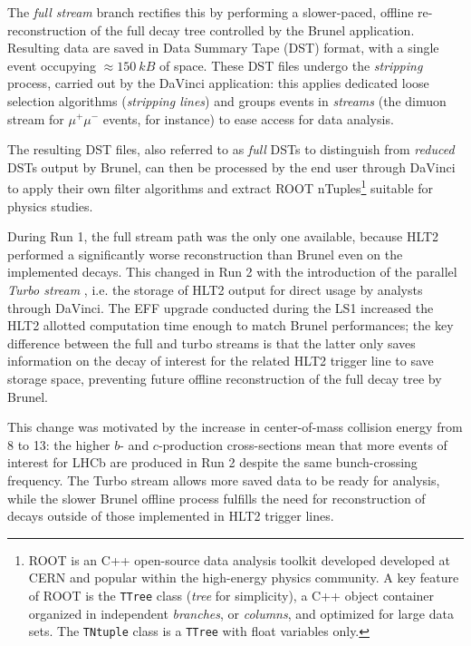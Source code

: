 The \textit{full stream} branch rectifies this by performing a slower-paced, offline re-reconstruction of the full decay tree controlled by the Brunel application.
Resulting data are saved in Data Summary Tape (DST) format, with a single event occupying $\approx \SI{150}{kB}$ of space.
These DST files undergo the \textit{stripping} process, carried out by the DaVinci application: this applies dedicated loose selection algorithms (\textit{stripping lines}) and groups events in \textit{streams} (the dimuon stream for $\mu^+\mu^-$ events, for instance) to ease access for data analysis.

The resulting DST files, also referred to as \textit{full} DSTs to distinguish from \textit{reduced} DSTs output by Brunel, can then be processed by the end user through DaVinci to apply their own filter algorithms and extract ROOT nTuples\footnote{ROOT \cite{ANTCHEVA20092499} is an C++ open-source data analysis toolkit developed developed at CERN and popular within the high-energy physics community. A key feature of ROOT is the \texttt{TTree} class (\textit{tree} for simplicity), a C++ object container organized in independent \textit{branches}, or \textit{columns}, and optimized for large data sets. The \texttt{TNtuple} class is a \texttt{TTree} with float variables only.} suitable for physics studies.

During Run 1, the full stream path was the only one available, because HLT2 performed a significantly worse reconstruction than Brunel even on the implemented decays.
This changed in Run 2 with the introduction of the parallel \textit{Turbo stream} \cite{Benson_2015}, i.e. the storage of HLT2 output for direct usage by analysts through DaVinci.
The EFF upgrade conducted during the LS1 increased the HLT2 allotted computation time enough to match
Brunel performances;
the key difference between the full and turbo streams is that the latter only saves information on the decay of interest for the related HLT2 trigger line to save storage space, preventing future offline reconstruction of the full decay tree by Brunel.

This change was motivated by the increase in center-of-mass collision energy from \SI{8}{\tev} to \SI{13}{\tev}: the higher $b$- and $c$-production cross-sections mean that more events of interest for LHCb are produced in Run 2 despite the same bunch-crossing frequency.
The Turbo stream allows more saved data to be ready for analysis, while the slower Brunel offline process fulfills the need for reconstruction of decays outside of those implemented in HLT2 trigger lines.


